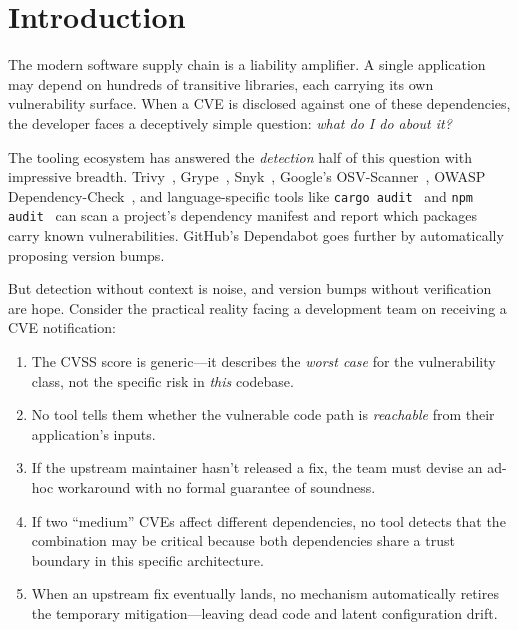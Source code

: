 \documentclass[11pt,twocolumn]{article}
\begin{document}
\section{Introduction}
\label{sec:introduction}

The modern software supply chain is a liability amplifier. A single
application may depend on hundreds of transitive libraries, each
carrying its own vulnerability surface. When a CVE is disclosed against
one of these dependencies, the developer faces a deceptively simple
question: \emph{what do I do about it?}

The tooling ecosystem has answered the \emph{detection} half of this
question with impressive breadth. Trivy~\cite{trivy}, Grype~\cite{grype},
Snyk~\cite{snyk}, Google's OSV-Scanner~\cite{osv-scanner}, OWASP
Dependency-Check~\cite{owasp-depcheck}, and language-specific tools
like \texttt{cargo audit}~\cite{cargo-audit} and \texttt{npm
audit}~\cite{npm-audit} can scan a project's dependency manifest and
report which packages carry known vulnerabilities. GitHub's Dependabot
goes further by automatically proposing version bumps.

But detection without context is noise, and version bumps without
verification are hope. Consider the practical reality facing a
development team on receiving a CVE notification:

\begin{enumerate}[nosep]
  \item The CVSS score is generic---it describes the \emph{worst case}
    for the vulnerability class, not the specific risk in \emph{this}
    codebase.
  \item No tool tells them whether the vulnerable code path is
    \emph{reachable} from their application's inputs.
  \item If the upstream maintainer hasn't released a fix, the team must
    devise an ad-hoc workaround with no formal guarantee of soundness.
  \item If two ``medium'' CVEs affect different dependencies, no tool
    detects that the combination may be critical because both
    dependencies share a trust boundary in this specific architecture.
  \item When an upstream fix eventually lands, no mechanism automatically
    retires the temporary mitigation---leaving dead code and latent
    configuration drift.
\end{enumerate}
\end{document}
